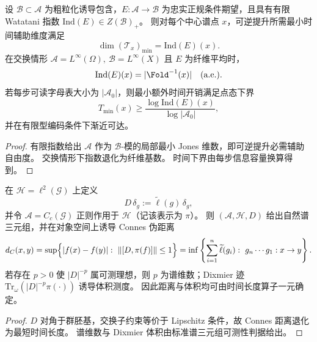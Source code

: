 \begin{theorem}\label{thm:xi-local-index-equals-local-time-fiber}
设 \(\mathcal B\subset\mathcal A\) 为粗粒化诱导包含，\(E:\mathcal A\to\mathcal B\) 为忠实正规条件期望，且具有有限 Watatani 指数 \(\mathrm{Ind}(E)\in Z(\mathcal B)_+\)。
则对每个中心谱点 \(x\)，可逆提升所需最小时间辅助维度满足
\[
\dim(\mathcal T_x)_{\min}=\mathrm{Ind}(E)(x).
\]
在交换情形
\(
\mathcal A=L^\infty(\Omega),\ \mathcal B=L^\infty(X)
\)
且 \(E\) 为纤维平均时，
\[
\mathrm{Ind}(E)(x)=|\Fold^{-1}(x)|\quad\text{(a.e.)}.
\]
若每步可读字母表大小为 \(|\mathcal A_0|\)，则最小额外时间开销满足点态下界
\[
T_{\min}(x)\ge \frac{\log \mathrm{Ind}(E)(x)}{\log |\mathcal A_0|},
\]
并在有限型编码条件下渐近可达。
\end{theorem}

\begin{proof}
有限指数给出 \(\mathcal A\) 作为 \(\mathcal B\)-模的局部最小 Jones 维数，即可逆提升必需辅助自由度。
交换情形下指数退化为纤维基数。
时间下界由每步信息容量换算得到。
\end{proof}

\begin{theorem}\label{thm:xi-time-spectral-triple-distance-volume}
在 \(\mathcal H=\ell^2(\mathcal G)\) 上定义
\[
D\,\delta_g:=\widetilde\ell(g)\,\delta_g,
\]
并令 \(\mathcal A=C_c(\mathcal G)\) 正则作用于 \(\mathcal H\)（记该表示为 \(\pi\)）。
则 \((\mathcal A,\mathcal H,D)\) 给出自然谱三元组，并在对象空间上诱导 Connes 伪距离
\[
d_C(x,y)
=
\sup\Bigl\{|f(x)-f(y)|:\ \|[D,\pi(f)]\|\le 1\Bigr\}
=
\inf\left\{
\sum_{i=1}^n\widetilde\ell(g_i):\ g_n\cdots g_1:x\to y
\right\}.
\]
若存在 \(p>0\) 使 \(|D|^{-p}\) 属可测理想，则 \(p\) 为谱维数；Dixmier 迹
\(
\mathrm{Tr}_\omega(|D|^{-p}\pi(\cdot))
\)
诱导体积测度。
因此距离与体积均可由时间长度算子一元确定。
\end{theorem}

\begin{proof}
\(D\) 对角于群胚基，交换子约束等价于 Lipschitz 条件，故 Connes 距离退化为最短时间长度。
谱维数与 Dixmier 体积由标准谱三元组可测性判据给出。
\end{proof}

